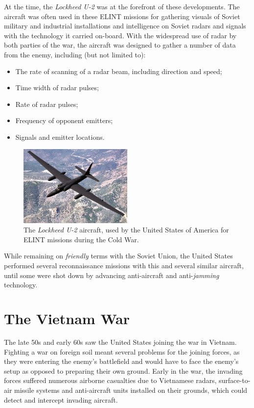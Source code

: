 \documentclass[english,purist]{ist-report}
\begin{document}
At the time, the \textit{Lockheed U-2} was at the forefront of these developments. The aircraft was often used in these ELINT missions for gathering visuals of Soviet military and industrial installations and intelligence on Soviet radars and signals with the technology it carried on-board. With the widespread use of radar by both parties of the war, the aircraft was designed to gather a number of data from the enemy, including (but not limited to):
\begin{itemize}
    \item The rate of scanning of a radar beam, including direction and speed;
    \item Time width of radar pulses;
    \item Rate of radar pulses;
    \item Frequency of opponent emitters;
    \item Signals and emitter locations.
\end{itemize}
\begin{figure}[ht]
    \centering
    \includegraphics[width = 0.5\textwidth]{lockheedu2}
    \caption{The \textit{Lockheed U-2} aircraft, used by the United States of America for ELINT missions during the Cold War.}
    \label{fig:u-2}
\end{figure}

While remaining on \textit{friendly} terms with the Soviet Union, the United States performed several reconnaissance missions with this and several similar aircraft, until some were shot down by advancing anti-aircraft and anti-\textit{jamming} technology.

\section{The Vietnam War}

The late 50s and early 60s saw the United States joining the war in Vietnam. Fighting a war on foreign soil meant several problems for the joining forces, as they were entering the enemy's battlefield and would have to face the enemy's setup as opposed to preparing their own ground. Early in the war, the invading forces suffered numerous airborne casualties due to Vietnamese radars, surface-to-air missile systems and anti-aircraft units installed on their grounds, which could detect and intercept invading aircraft.
\end{document}
